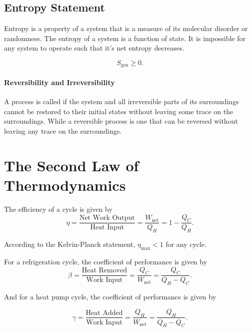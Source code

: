 \documentclass{report}
\begin{document}
\section{Entropy Statement}

Entropy is a property of a system that is a measure of its molecular disorder or randomness. The entropy of a system is a function of state. It is impossible for any system to operate such that it's net entropy decreases.

\[
	S_\text{gen} \geq 0
	.\]

\subsubsection{Reversibility and Irreversibility}

A process is called if the system and all irreversible parts of its surroundings cannot be restored to their initial states without leaving some trace on the surroundings. While a reversible process is one that can be reversed without leaving any trace on the surroundings.


\chapter{The Second Law of Thermodynamics}

The efficiency of a cycle is given by
\[
	\eta = \frac{\text{Net Work Output}}{\text{Heat Input}} = \frac{W_\text{net}}{Q_H} = 1 - \frac{Q_C}{Q_H}
	.\]

According to the Kelvin-Planck statement, $\eta_\text{max} < 1$ for any cycle.



For a refrigeration cycle, the coefficient of performance is given by
\[
	\beta = \frac{\text{Heat Removed}}{\text{Work Input}} = \frac{Q_C}{W_\text{net}} = \frac{Q_C}{Q_H - Q_C}
	.\]

And for a heat pump cycle, the coefficient of performance is given by

\[
	\gamma = \frac{\text{Heat Added}}{\text{Work Input}} = \frac{Q_H}{W_\text{net}} = \frac{Q_H}{Q_H - Q_C}
	.\]
\end{document}
